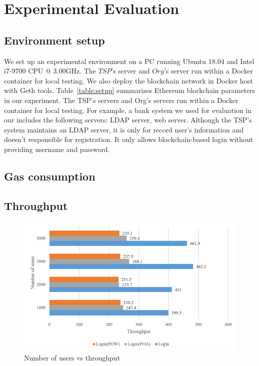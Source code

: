 \chapter{Experimental Evaluation}
\label{chapter:evaluation}


\section{Environment setup}

We set up an experimental environment on a PC running Ubuntu 18.04 and Intel i7-9700 CPU @ 3.00GHz. The \(TSP\)'s server and \(Org\)'s server run within a Docker container for local testing. We also deploy the blockchain network in Docker host with Geth tools. Table~\ref{table:setup} summarizes Ethereum blockchain parameters in our experiment. The TSP's servers and Org's servers run within a Docker container for local testing. For example, a bank system we used for evaluation in our includes the following servers: LDAP server, web server. Although the TSP's system maintains an LDAP server, it is only for record user's information and doesn't responsible for registration. It only allows blockchain-based login without providing username and password. 


\section{Gas consumption}


\section{Throughput}
\begin{figure}[htb]
    \centering
    \includegraphics[height=!,width=0.9\linewidth,keepaspectratio=true]{figures/login-throughput.png}
    \caption{{\footnotesize Number of users vs throughput}}
    \label{fig:loginThroughput}
\end{figure}

